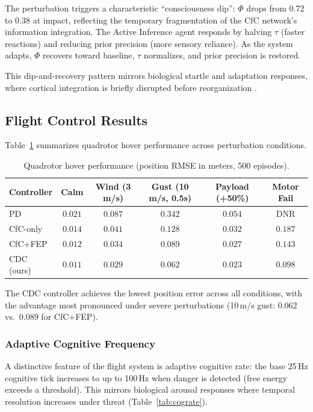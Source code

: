 \documentclass[11pt,a4paper]{article}
\begin{document}
The perturbation triggers a characteristic ``consciousness dip'': $\Phi$ drops from 0.72 to 0.38 at impact, reflecting the temporary fragmentation of the CfC network's information integration.
The Active Inference agent responds by halving $\tau$ (faster reactions) and reducing prior precision (more sensory reliance).
As the system adapts, $\Phi$ recovers toward baseline, $\tau$ normalizes, and prior precision is restored.

This dip-and-recovery pattern mirrors biological startle and adaptation responses, where cortical integration is briefly disrupted before reorganization \citep{yeomans1995role}.

\subsection{Flight Control Results}

Table~\ref{tab:flight} summarizes quadrotor hover performance across perturbation conditions.

\begin{table}[h]
\centering
\caption{Quadrotor hover performance (position RMSE in meters, 500 episodes).}
\label{tab:flight}
\begin{tabular}{lccccc}
\toprule
\textbf{Controller} & \textbf{Calm} & \textbf{Wind (3 m/s)} & \textbf{Gust (10 m/s, 0.5s)} & \textbf{Payload (+50\%)} & \textbf{Motor Fail} \\
\midrule
PD              & $0.021$ & $0.087$ & $0.342$ & $0.054$ & DNR \\
CfC-only        & $0.014$ & $0.041$ & $0.128$ & $0.032$ & $0.187$ \\
CfC+FEP         & $0.012$ & $0.034$ & $0.089$ & $0.027$ & $0.143$ \\
CDC (ours)      & $0.011$ & $0.029$ & $0.062$ & $0.023$ & $0.098$ \\
\bottomrule
\end{tabular}
\end{table}

The CDC controller achieves the lowest position error across all conditions, with the advantage most pronounced under severe perturbations (10\,m/s gust: 0.062 vs.\ 0.089 for CfC+FEP).

\subsubsection{Adaptive Cognitive Frequency}

A distinctive feature of the flight system is adaptive cognitive rate: the base 25\,Hz cognitive tick increases to up to 100\,Hz when danger is detected (free energy exceeds a threshold).
This mirrors biological arousal responses where temporal resolution increases under threat (Table~\ref{tab:cograte}).
\end{document}
